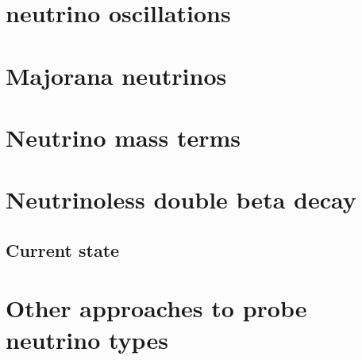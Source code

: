 \section{neutrino oscillations}
\label{sec:osci}

\section{Majorana neutrinos}
\label{sec:major}

\section{Neutrino mass terms}
\label{sec:mass}

\section{Neutrinoless double beta decay}
\label{sec:0n2b}

\subsection{Current state}
\label{sec:state}

\section{Other approaches to probe neutrino types}
\label{sec:others}



